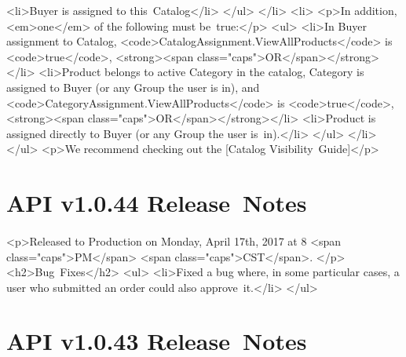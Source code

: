 \documentclass{memoir}%
\begin{document}
<li>Buyer is assigned to this~Catalog</li>\newline%
</ul>\newline%
</li>\newline%
<li>\newline%
<p>In addition, <em>one</em> of the following must be~true:</p>\newline%
<ul>\newline%
<li>In Buyer assignment to Catalog, <code>CatalogAssignment.ViewAllProducts</code> is <code>true</code>, <strong><span class="caps">OR</span></strong></li>\newline%
<li>Product belongs to active Category in the catalog, Category is assigned to Buyer (or any Group the user is in), and <code>CategoryAssignment.ViewAllProducts</code> is <code>true</code>, <strong><span class="caps">OR</span></strong></li>\newline%
<li>Product is assigned directly to Buyer (or any Group the user is~in).</li>\newline%
</ul>\newline%
</li>\newline%
</ul>\newline%
<p>We recommend checking out the {[}Catalog Visibility~Guide{]}</p>

%
\section*{API v1.0.44 Release~Notes}%
\paragraph*{}%

%
\paragraph*{}%
<p>Released to Production on Monday, April 17th, 2017 at 8 <span class="caps">PM</span> <span class="caps">CST</span>. </p>\newline%
<h2>Bug~Fixes</h2>\newline%
<ul>\newline%
<li>Fixed a bug where, in some particular cases, a user who submitted an order could also approve~it.</li>\newline%
</ul>

%
\section*{API v1.0.43 Release~Notes}%
\end{document}
